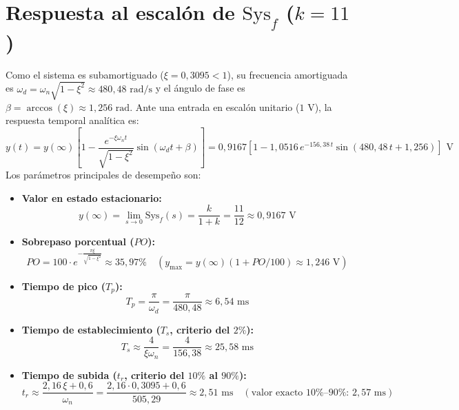 \documentclass[11pt,a4paper]{article}
\begin{document}
\section{Respuesta al escalón de $\text{Sys}_f$ ($k = 11$)}
Como el sistema es subamortiguado ($\xi = 0,3095 < 1$), su frecuencia amortiguada es $\omega_d = \omega_n\sqrt{1 - \xi^2} \approx 480,48\text{ rad/s}$ y el ángulo de fase es $\beta = \arccos(\xi) \approx 1,256\text{ rad}$. Ante una entrada en escalón unitario ($1\text{ V}$), la respuesta temporal analítica es:
\begin{equation}
    y(t) = y(\infty)\left[1 - \frac{e^{-\xi\omega_n t}}{\sqrt{1 - \xi^2}}\sin(\omega_d t + \beta)\right] = 0,9167\left[1 - 1,0516\,e^{-156,38\,t}\sin(480,48\,t + 1,256)\right]\text{ V}
\end{equation}
Los parámetros principales de desempeño son:
\begin{itemize}
    \item \textbf{Valor en estado estacionario:}
    \begin{equation}
        y(\infty) = \lim_{s \to 0} \text{Sys}_f(s) = \frac{k}{1+k} = \frac{11}{12} \approx 0,9167\text{ V}
    \end{equation}
    \item \textbf{Sobrepaso porcentual ($PO$):}
    \begin{equation}
        PO = 100 \cdot e^{-\frac{\pi\xi}{\sqrt{1-\xi^2}}} \approx 35,97\% \quad \left(y_{\max} = y(\infty)(1 + PO/100) \approx 1,246\text{ V}\right)
    \end{equation}
    \item \textbf{Tiempo de pico ($T_p$):}
    \begin{equation}
        T_p = \frac{\pi}{\omega_d} = \frac{\pi}{480,48} \approx 6,54\text{ ms}
    \end{equation}
    \item \textbf{Tiempo de establecimiento ($T_s$, criterio del $2\%$):}
    \begin{equation}
        T_s \approx \frac{4}{\xi\omega_n} = \frac{4}{156,38} \approx 25,58\text{ ms}
    \end{equation}
    \item \textbf{Tiempo de subida ($t_r$, criterio del $10\%$ al $90\%$):}
    \begin{equation}
        t_r \approx \frac{2,16\,\xi + 0,6}{\omega_n} = \frac{2,16 \cdot 0,3095 + 0,6}{505,29} \approx 2,51\text{ ms} \quad (\text{valor exacto } 10\%\text{--}90\%\text{: } 2,57\text{ ms})
    \end{equation}
\end{itemize}
\end{document}
